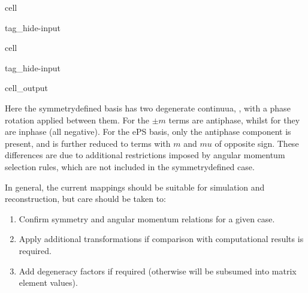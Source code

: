 \documentclass[letterpaper,table,10pt,english]{jupyterBook}
\begin{document}
\begin{sphinxuseclass}{cell}
\begin{sphinxuseclass}{tag_hide-input}
\end{sphinxuseclass}
\end{sphinxuseclass}
\begin{sphinxuseclass}{cell}
\begin{sphinxuseclass}{tag_hide-input}\begin{sphinxVerbatimOutput}

\begin{sphinxuseclass}{cell_output}
\end{sphinxuseclass}\end{sphinxVerbatimOutput}

\end{sphinxuseclass}
\end{sphinxuseclass}
\sphinxAtStartPar
Here the symmetry\sphinxhyphen{}defined basis has two degenerate continuua, , with a phase rotation applied between them. For  the \(\pm m\) terms are anti\sphinxhyphen{}phase, whilst for  they are in\sphinxhyphen{}phase (all negative). For the ePS basis, only the anti\sphinxhyphen{}phase component is present, and is further reduced to terms with \(m\) and \(mu\) of opposite sign. These differences are due to additional restrictions imposed by angular momentum selection rules, which are not included in the symmetry\sphinxhyphen{}defined case.

\sphinxAtStartPar
In general, the current mappings should be suitable for simulation and reconstruction, but care should be taken to:
\begin{enumerate}
%
\item {} 
\sphinxAtStartPar
Confirm symmetry and angular momentum relations for a given case.

\item {} 
\sphinxAtStartPar
Apply additional transformations if comparison with computational results is required.

\item {} 
\sphinxAtStartPar
Add degeneracy factors if required (otherwise will be subsumed into matrix element values).

\end{enumerate}

\sphinxstepscope
\end{document}
